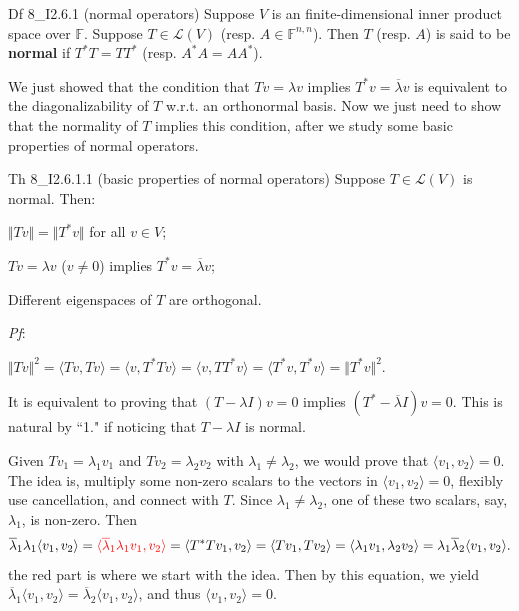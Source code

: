 \documentclass{article}
\begin{document}
\begin{Df}{Df 8\_I2.6.1 (normal operators)}
    Suppose $V$ is an finite-dimensional inner product space over $\mathbb{F}$. Suppose $T\in\mathcal{L}(V)$ (resp. $A\in\mathbb{F}^{n, n}$). Then $T$ (resp. $A$) is said to be \textbf{normal} if $T^*T = TT^*$ (resp. $A^*A = AA^*$).
\end{Df}

We just showed that the condition that $Tv = \lambda v$ implies $T^*v = \overline{\lambda}v$ is equivalent to the diagonalizability of $T$ w.r.t. an orthonormal basis. Now we just need to show that the normality of $T$ implies this condition, after we study some basic properties of normal operators.

\begin{Th}{Th 8\_I2.6.1.1 (basic properties of normal operators)}
    Suppose $T\in\mathcal{L}(V)$ is normal. Then:
    \begin{compactenum}
        \item $\Vert Tv\Vert = \Vert T^*v\Vert$ for all $v\in V$;
        \item $Tv = \lambda v$ ($v\neq 0$) implies $T^*v = \overline{\lambda}v$;
        \item Different eigenspaces of $T$ are orthogonal.
    \end{compactenum}
    \tcblower
    \textit{Pf}:
    \begin{compactenum}
        \item $\Vert Tv\Vert^2 = \langle Tv, Tv\rangle = \langle v, T^*Tv\rangle = \langle v, TT^*v\rangle = \langle T^*v, T^*v\rangle = \Vert T^*v\Vert^2$.
        \item It is equivalent to proving that $(T-\lambda I)v = 0$ implies $(T^*-\overline{\lambda}I)v = 0$. This is natural by ``1." if noticing that $T-\lambda I$ is normal.
        \item Given $Tv_1 = \lambda_1v_1$ and $Tv_2 = \lambda_2v_2$ with $\lambda_1\neq\lambda_2$, we would prove that $\langle v_1, v_2\rangle = 0$. The idea is, multiply some non-zero scalars to the vectors in $\langle v_1, v_2\rangle = 0$, flexibly use cancellation, and connect with $T$. Since $\lambda_1\neq\lambda_2$, one of these two scalars, say, $\lambda_1$, is non-zero. Then 
        $$ \overline{\lambda}_1\lambda_1\langle v_1, v_2\rangle = \textcolor{red}{\langle \overline{\lambda}_1\lambda_1v_1, v_2\rangle} = \langle T^*Tv_1, v_2\rangle = \langle Tv_1, Tv_2\rangle = \langle \lambda_1v_1, \lambda_2v_2\rangle = \lambda_1\overline{\lambda}_2\langle v_1, v_2\rangle. $$
        the red part is where we start with the idea. Then by this equation, we yield $\overline{\lambda}_1\langle v_1, v_2\rangle = \overline{\lambda}_2\langle v_1, v_2\rangle$, and thus $\langle v_1, v_2\rangle = 0$.
    \end{compactenum}
\end{Th}
\end{document}
